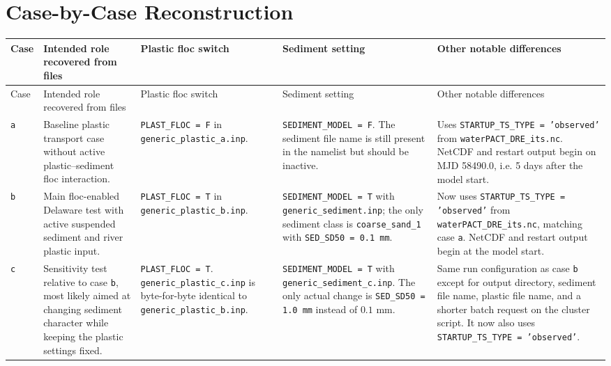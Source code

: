 \documentclass[11pt]{article}
\begin{document}
\section{Case-by-Case Reconstruction}
\begin{longtable}{>{\raggedright\arraybackslash}p{} >{\raggedright\arraybackslash}p{} >{\raggedright\arraybackslash}p{} >{\raggedright\arraybackslash}p{} >{\raggedright\arraybackslash}p{}}
\toprule
Case & Intended role recovered from files & Plastic floc switch & Sediment setting & Other notable differences \\
\midrule
\endfirsthead
\toprule
Case & Intended role recovered from files & Plastic floc switch & Sediment setting & Other notable differences \\
\midrule
\endhead
\texttt{a} &
Baseline plastic transport case without active plastic--sediment floc interaction. &
\texttt{PLAST\_FLOC = F} in \texttt{generic\_plastic\_a.inp}. &
\texttt{SEDIMENT\_MODEL = F}. The sediment file name is still present in the namelist but should be inactive. &
Uses \texttt{STARTUP\_TS\_TYPE = 'observed'} from \texttt{waterPACT\_DRE\_its.nc}. NetCDF and restart output begin on MJD 58490.0, i.e. 5 days after the model start. \\
\texttt{b} &
Main floc-enabled Delaware test with active suspended sediment and river plastic input. &
\texttt{PLAST\_FLOC = T} in \texttt{generic\_plastic\_b.inp}. &
\texttt{SEDIMENT\_MODEL = T} with \texttt{generic\_sediment.inp}; the only sediment class is \texttt{coarse\_sand\_1} with \texttt{SED\_SD50 = 0.1 mm}. &
Now uses \texttt{STARTUP\_TS\_TYPE = 'observed'} from \texttt{waterPACT\_DRE\_its.nc}, matching case \texttt{a}. NetCDF and restart output begin at the model start. \\
\texttt{c} &
Sensitivity test relative to case \texttt{b}, most likely aimed at changing sediment character while keeping the plastic settings fixed. &
\texttt{PLAST\_FLOC = T}. \texttt{generic\_plastic\_c.inp} is byte-for-byte identical to \texttt{generic\_plastic\_b.inp}. &
\texttt{SEDIMENT\_MODEL = T} with \texttt{generic\_sediment\_c.inp}. The only actual change is \texttt{SED\_SD50 = 1.0 mm} instead of \(0.1\) mm. &
Same run configuration as case \texttt{b} except for output directory, sediment file name, plastic file name, and a shorter batch request on the cluster script. It now also uses \texttt{STARTUP\_TS\_TYPE = 'observed'}. \\
\bottomrule
\end{longtable}
\end{document}
